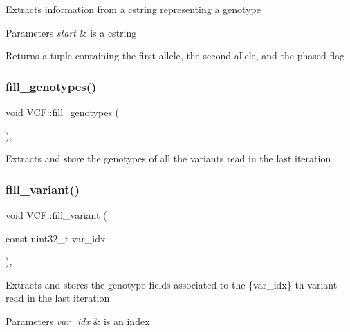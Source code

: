 Extracts information from a cstring representing a genotype


\begin{DoxyParams}{Parameters}
{\em start} & is a cstring \\
\hline
\end{DoxyParams}
\begin{DoxyReturn}{Returns}
a tuple containing the first allele, the second allele, and the phased flag 
\end{DoxyReturn}
\mbox{\label{classVCF_a8252c15bb2e4e7a517459ee4bc80ea92}} 
\subsubsection{\texorpdfstring{fill\_genotypes()}{fill\_genotypes()}}
{\footnotesize\ttfamily void V\+C\+F\+::fill\+\_\+genotypes (\begin{DoxyParamCaption}{ }\end{DoxyParamCaption})\hspace{0.3cm}{\ttfamily [inline]}, {\ttfamily [private]}}

Extracts and store the genotypes of all the variants read in the last iteration \mbox{\label{classVCF_ae26856f38fd616a79c41e40ab61a308f}} 
\subsubsection{\texorpdfstring{fill\_variant()}{fill\_variant()}}
{\footnotesize\ttfamily void V\+C\+F\+::fill\+\_\+variant (\begin{DoxyParamCaption}\item[{const uint32\+\_\+t}]{var\+\_\+idx }\end{DoxyParamCaption})\hspace{0.3cm}{\ttfamily [inline]}, {\ttfamily [private]}}

Extracts and stores the genotype fields associated to the \{var\+\_\+idx\}-\/th variant read in the last iteration


\begin{DoxyParams}{Parameters}
{\em var\+\_\+idx} & is an index \\
\hline
\end{DoxyParams}
\mbox{\label{classVCF_a18a5db0368a429daed852bc04e5142c9}} 
